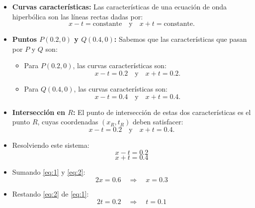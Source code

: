 \begin{itemize}
    \item \textbf{Curvas características:} Las características de una ecuación de onda hiperbólica son las líneas rectas dadas por:
    \begin{equation}
    x - t = \text{constante} \quad \text{y} \quad x + t = \text{constante}.
    \end{equation}

    \item \textbf{Puntos $P(0.2, 0)$ y $Q(0.4, 0)$:} Sabemos que las características que pasan por $P$ y $Q$ son:
    \begin{itemize}
        \item Para $P(0.2, 0)$, las curvas características son:
        \begin{equation}
        x - t = 0.2 \quad \text{y} \quad x + t = 0.2.
        \end{equation}
        
        \item Para $Q(0.4, 0)$, las curvas características son:
        \begin{equation}
        x - t = 0.4 \quad \text{y} \quad x + t = 0.4.
        \end{equation}
    \end{itemize}

    \item \textbf{Intersección en $R$:} El punto de intersección de estas dos características es el punto $R$, cuyas coordenadas $(x_R, t_R)$ deben satisfacer:
    \begin{equation}
    x - t = 0.2 \quad \text{y} \quad x + t = 0.4.
    \end{equation}

    \item Resolviendo este sistema:
    \begin{equation}\label{eq:1}
    x - t = 0.2
    \end{equation}
    \begin{equation}\label{eq:2}
    x + t = 0.4
    \end{equation}

    \item Sumando \ref{eq:1} y \ref{eq:2}:
    \begin{equation}
    2x = 0.6 \quad \Rightarrow \quad x = 0.3
    \end{equation}

    \item Restando \ref{eq:2} de \ref{eq:1}:
    \begin{equation}
    2t = 0.2 \quad \Rightarrow \quad t = 0.1
    \end{equation}
\end{itemize}

